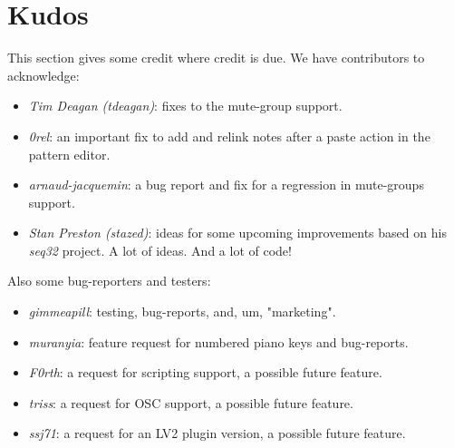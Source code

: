 %
%
%

\section{Kudos}
\label{sec:kudos}

   This section gives some credit where credit is due.
   We have contributors to acknowledge:

   \begin{itemize}
      \item \textsl{Tim Deagan (tdeagan)}:
         fixes to the mute-group support.
      \item \textsl{0rel}:
         an important fix to add and relink notes after a
         paste action in the pattern editor.
      \item \textsl{arnaud-jacquemin}:
         a bug report and fix for a regression in mute-groups support.
      \item \textsl{Stan Preston (stazed)}:
         ideas for some upcoming improvements based
         on his \textsl{seq32} project.  A lot of ideas.
         And a lot of code!
   \end{itemize}

   Also some bug-reporters and testers:

   \begin{itemize}
      \item \textsl{gimmeapill}:
         testing, bug-reports, and, um, "marketing".
      \item \textsl{muranyia}:
         feature request for numbered piano keys and bug-reports.
      \item \textsl{F0rth}:
         a request for scripting support, a possible future feature.
      \item \textsl{triss}:
         a request for OSC support, a possible future feature.
      \item \textsl{ssj71}:
         a request for an LV2 plugin version, a possible future feature.
   \end{itemize}

